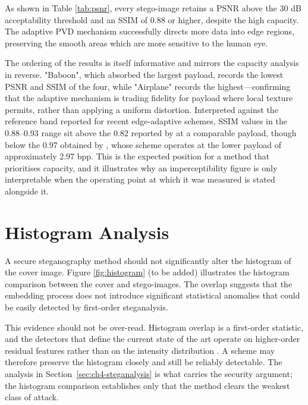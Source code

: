 As shown in Table \ref{tab:psnr}, every stego-image retains a PSNR above the 30 dB acceptability threshold and an SSIM of 0.88 or higher, despite the high capacity. The adaptive PVD mechanism successfully directs more data into edge regions, preserving the smooth areas which are more sensitive to the human eye.

The ordering of the results is itself informative and mirrors the capacity analysis in reverse. "Baboon", which absorbed the largest payload, records the lowest PSNR and SSIM of the four, while "Airplane" records the highest---confirming that the adaptive mechanism is trading fidelity for payload where local texture permits, rather than applying a uniform distortion. Interpreted against the reference band reported for recent edge-adaptive schemes, SSIM values in the 0.88--0.93 range sit above the 0.82 reported by \citet{singh2026edgeopt} at a comparable payload, though below the 0.97 obtained by \citet{ismail2026edgeadaptive}, whose scheme operates at the lower payload of approximately 2.97 bpp. This is the expected position for a method that prioritises capacity, and it illustrates why an imperceptibility figure is only interpretable when the operating point at which it was measured is stated alongside it.

\section{Histogram Analysis}
A secure steganography method should not significantly alter the histogram of the cover image. Figure \ref{fig:histogram} (to be added) illustrates the histogram comparison between the cover and stego-images. The overlap suggests that the embedding process does not introduce significant statistical anomalies that could be easily detected by first-order steganalysis.

This evidence should not be over-read. Histogram overlap is a first-order statistic, and the detectors that define the current state of the art operate on higher-order residual features rather than on the intensity distribution \citep{kombrink2025survey}. A scheme may therefore preserve the histogram closely and still be reliably detectable. The analysis in Section~\ref{sec:ch4-steganalysis} is what carries the security argument; the histogram comparison establishes only that the method clears the weakest class of attack.

